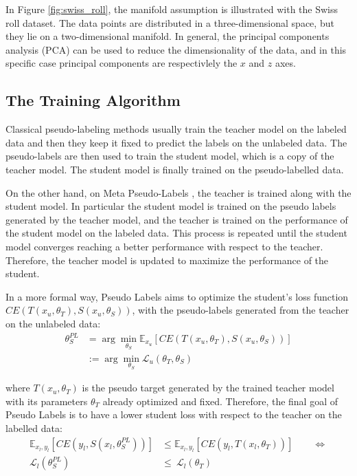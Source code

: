 In Figure \ref{fig:swiss_roll}, the manifold assumption is illustrated with the 
Swiss roll dataset. The data points are distributed in a three-dimensional 
space, but they lie on a two-dimensional manifold. In general, the principal 
components analysis (PCA) can be used to reduce the dimensionality of the data, 
and in this specific case principal components are respectivlely the $x$ and $z$ 
axes.


\subsection{The Training Algorithm}
Classical pseudo-labeling methods usually train the teacher model on the labeled 
data and then they keep it fixed to predict the labels on the unlabeled data. 
The pseudo-labels are then used to train the student model, which is a copy of 
the teacher model. The student model is finally trained on the pseudo-labelled 
data.

On the other hand, on Meta Pseudo-Labels \cite{pham2021meta}, the teacher is 
trained along with the student model. In particular the student model is trained 
on the pseudo labels generated by the teacher model, and the teacher is trained 
on the performance of the student model on the labeled data. This process is 
repeated until the student model converges reaching a better performance 
with respect to the teacher. Therefore, the teacher model is updated to 
maximize the performance of the student.

In a more formal way, Pseudo Labels aims to optimize the student's 
loss function $CE(T(x_u, \theta_T), S(x_u, \theta_S))$, with the pseudo-labels 
generated from the teacher on the unlabeled data:
\begin{align}
    \theta_S^{PL} &= \arg \min_{\theta_S} \mathbb{E}_{x_u}\left[
        {CE(T(x_u, \theta_T), S(x_u, \theta_S))}\right] 
        \label{eq:pl_student_param}\\
        &:=
        \arg \min_{\theta_S} \mathcal{L}_u(\theta_T, \theta_S) \nonumber
\end{align}

where $T(x_u, \theta_T)$ is the pseudo target generated by the trained teacher 
model with its parameters $\theta_T$ already optimized and fixed. 
Therefore, the final goal of 
Pseudo Labels is to have a lower student loss with respect to the teacher on 
the labelled data:
\begin{align}
    \mathbb{E}_{x_l, y_l}\left[CE(y_l, S(x_l, \theta_S^{PL}))\right]
    &\leq
    \mathbb{E}_{x_l, y_l}\left[CE(y_l, T(x_l, \theta_T))\right]
    \qquad \Longleftrightarrow 
    \label{eq:pl_student_loss}\\
    \mathcal{L}_l(\theta_S^{PL})
    &\leq\
    \mathcal{L}_l(\theta_T) 
    \nonumber
\end{align}

